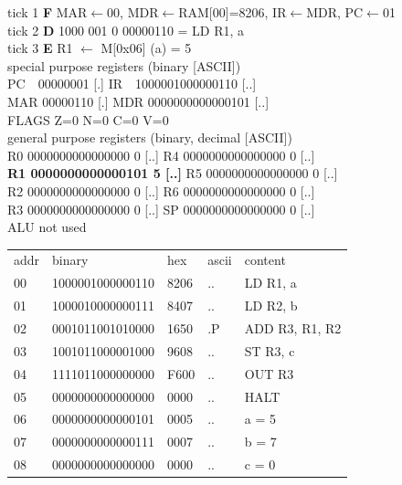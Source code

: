 \noindent\begin{tcolorbox}[stepbox, title={Instruction 1 \hfill ticks 1 to 3 \quad LD R1, a}]
\textcolor{dim}{tick 1} \textbf{F} MAR$\leftarrow$00, MDR$\leftarrow$RAM[00]=8206, IR$\leftarrow$MDR, PC$\leftarrow$01\\
\textcolor{dim}{tick 2} \textbf{D} 1000 001 0 00000110 = LD R1, a\\
\textcolor{dim}{tick 3} \textbf{E} R1 $\leftarrow$ M[0x06] (a) = 5\\[2pt]
\textcolor{dim}{special purpose registers (binary [ASCII])}\\
PC~~00000001 [.] \hfill IR~~1000001000000110 [..]\\
MAR 00000110 [.] \hfill MDR 0000000000000101 [..]\\
FLAGS Z=0 N=0 C=0 V=0\\[2pt]
\textcolor{dim}{general purpose registers (binary, decimal [ASCII])}\\
R0 0000000000000000 0 [..] \hfill R4 0000000000000000 0 [..]\\
\textcolor{wrt}{\textbf{R1 0000000000000101 5 [..]}} \hfill R5 0000000000000000 0 [..]\\
R2 0000000000000000 0 [..] \hfill R6 0000000000000000 0 [..]\\
R3 0000000000000000 0 [..] \hfill SP 0000000000000000 0 [..]\\
\textcolor{dim}{ALU not used}\\[2pt]
{\setlength{\tabcolsep}{2pt}\begin{tabular}{@{}lllll@{}}
\textcolor{dim}{addr} & \textcolor{dim}{binary} & \textcolor{dim}{hex} & \textcolor{dim}{ascii} & \textcolor{dim}{content}\\
00 & 1000001000000110 & 8206 & .. & LD R1, a\\
\rowcolor{pcc}01 & 1000010000000111 & 8407 & .. & LD R2, b\\
02 & 0001011001010000 & 1650 & .P & ADD R3, R1, R2\\
03 & 1001011000001000 & 9608 & .. & ST R3, c\\
04 & 1111011000000000 & F600 & .. & OUT R3\\
05 & 0000000000000000 & 0000 & .. & HALT\\
\rowcolor{datac}06 & 0000000000000101 & 0005 & .. & a = 5\\
\rowcolor{datac}07 & 0000000000000111 & 0007 & .. & b = 7\\
\rowcolor{datac}08 & 0000000000000000 & 0000 & .. & c = 0\\
\end{tabular}}

\end{tcolorbox}
